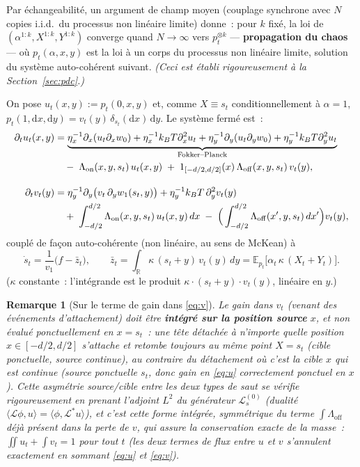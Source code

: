 \documentclass[11pt,a4paper]{article}
\newcommand{\ind}[1]{\mathrm{1}_{#1}}
\newcommand{\dd}{\mathrm{d}}
\newcommand{\E}{\mathbb{E}}
\newcommand{\R}{\mathbb{R}}
\newcommand{\Lon}{\Lambda_{\mathrm{on}}}
\newcommand{\Loff}{\Lambda_{\mathrm{off}}}
\theoremstyle{plain}
\newtheorem*{remark*}{Remarque}
\theoremstyle{definition}
\begin{document}
Par \'echangeabilit\'e, un argument de champ moyen (couplage synchrone avec $N$ copies i.i.d.\ du processus non lin\'eaire limite) donne~: pour $k$ fix\'e, la loi de $(\alpha^{1:k},X^{1:k},Y^{1:k})$ converge quand $N\to\infty$ vers $p_t^{\otimes k}$ --- \textbf{propagation du chaos} --- o\`u $p_t(\alpha,x,y)$ est la loi \`a un corps du processus non lin\'eaire limite, solution du syst\`eme auto-coh\'erent suivant. \emph{(Ceci est \'etabli rigoureusement \`a la Section~\ref{sec:pdc}.)}

On pose $u_t(x,y):=p_t(0,x,y)$ et, comme $X\equiv s_t$ conditionnellement \`a $\alpha=1$, $p_t(1,\dd x,\dd y)=v_t(y)\,\delta_{s_t}(\dd x)\,\dd y$. Le syst\`eme ferm\'e est~:
\begin{align}
\partial_t u_t(x,y) &= \underbrace{\eta_x^{-1}\partial_x(u_t\partial_xw_0)+\eta_x^{-1}k_BT\partial_x^2u_t + \eta_y^{-1}\partial_y(u_t\partial_yw_0)+\eta_y^{-1}k_BT\partial_y^2u_t}_{\text{Fokker--Planck}} \notag \\
&\quad -\;\Lon(x,y,s_t)\,u_t(x,y) \;+\; \ind{[-d/2,d/2]}(x)\,\Loff(x,y,s_t)\,v_t(y), \label{eq:u}\\[1em]
\partial_t v_t(y) &= \eta_y^{-1}\partial_y\big(v_t\,\partial_yw_1(s_t,y)\big)+\eta_y^{-1}k_BT\,\partial_y^2v_t(y) \notag\\
&\quad +\;\int_{-d/2}^{d/2}\Lon(x,y,s_t)\,u_t(x,y)\,dx \;-\;\Big(\int_{-d/2}^{d/2}\Loff(x',y,s_t)\,dx'\Big)v_t(y), \label{eq:v}
\end{align}
coupl\'e de fa\c con auto-coh\'erente (non lin\'eaire, au sens de McKean) \`a
\begin{equation}
\boxed{\;\dot s_t=\frac{1}{v_1}\big(f-\bar z_t\big),\qquad \bar z_t=\int_{\R}\kappa\,(s_t+y)\,v_t(y)\,dy = \E_{p_t}\big[\alpha_t\,\kappa\,(X_t+Y_t)\big].\;}
\label{eq:closure}
\end{equation}
($\kappa$ constante~: l'int\'egrande est le produit $\kappa\cdot(s_t+y)\cdot v_t(y)$, lin\'eaire en $y$.)

\begin{remark*}[Sur le terme de gain dans \eqref{eq:v}]
Le gain dans $v_t$ (venant des \'ev\'enements d'attachement) doit \^etre \textbf{int\'egr\'e sur la position source} $x$, et non \'evalu\'e ponctuellement en $x=s_t$~: une t\^ete d\'etach\'ee \`a n'importe quelle position $x\in[-d/2,d/2]$ s'attache et retombe toujours au m\^eme point $X=s_t$ (cible ponctuelle, source continue), au contraire du d\'etachement o\`u c'est la \emph{cible} $x$ qui est continue (source ponctuelle $s_t$, donc gain en \eqref{eq:u} correctement ponctuel en $x$). Cette asym\'etrie source/cible entre les deux types de saut se v\'erifie rigoureusement en prenant l'adjoint $L^2$ du g\'en\'erateur $\mathcal L^{(0)}_s$ (dualit\'e $\langle\mathcal L\phi,u\rangle=\langle\phi,\mathcal L^*u\rangle$), et c'est cette forme int\'egr\'ee, symm\'etrique du terme $\int\Loff$ d\'ej\`a pr\'esent dans la perte de $v$, qui assure la conservation exacte de la masse~: $\iint u_t+\int v_t=1$ pour tout $t$ (les deux termes de flux entre $u$ et $v$ s'annulent exactement en sommant \eqref{eq:u} et \eqref{eq:v}).
\end{remark*}
\end{document}
